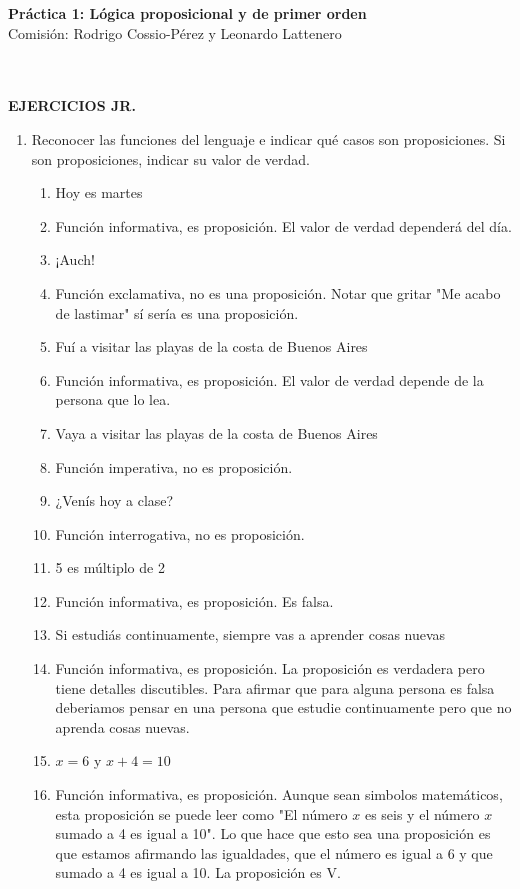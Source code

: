 \documentclass[a4paper]{article}
\newcommand{\answer}{\item[**]}
\newcommand{\exercise}{\item}
\begin{document}
\noindent \hrulefill 
\vspace{-7pt}
\begin{center} 
	\textbf{ Práctica 1: Lógica proposicional y de primer orden } \\
	Comisión: Rodrigo Cossio-Pérez y Leonardo Lattenero
\end{center}
\vspace{-10pt}
\hrulefill \\
\phantom{~} \\
\textbf{EJERCICIOS JR.}

\begin{enumerate}

	\exercise Reconocer las funciones del lenguaje e indicar qué casos son proposiciones. Si son proposiciones, indicar su valor de verdad.
	\begin{multicols}{2}
	\begin{enumerate} [label=(\alph*)]
		\item Hoy es martes 
		\answer Función informativa, es proposición. El valor de verdad dependerá del día.

		\item ¡Auch!
		\answer Función exclamativa, no es una proposición. Notar que gritar "Me acabo de lastimar" sí sería es una proposición.

		\item Fuí a visitar las playas de la costa de Buenos Aires 
		\answer Función informativa, es proposición. El valor de verdad depende de la persona que lo lea.

		\item Vaya a visitar las playas de la costa de Buenos Aires
		\answer Función imperativa, no es proposición.

		\item ¿Venís hoy a clase?
		\answer Función interrogativa, no es proposición.

		\item 5 es múltiplo de 2 
		\answer Función informativa, es proposición. Es falsa.

		\item Si estudiás continuamente, siempre vas a aprender cosas nuevas 
		\answer Función informativa, es proposición. La proposición es verdadera pero tiene detalles discutibles. Para afirmar que para alguna persona es falsa deberiamos pensar en una persona que estudie continuamente pero que no aprenda cosas nuevas.

		\item $x=6$ y $x+4=10$ 
		\answer Función informativa, es proposición. Aunque sean simbolos matemáticos, esta proposición se puede leer como "El número $x$ es seis y el número $x$ sumado a 4 es igual a 10". Lo que hace que esto sea una proposición es que estamos afirmando las igualdades, que el número es igual a 6 y que sumado a 4 es igual a 10. La proposición es V.


\end{enumerate}
\end{multicols}
\end{enumerate}
\end{document}
